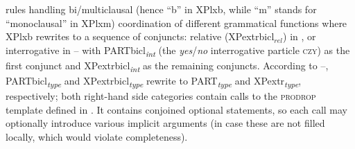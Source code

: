 \documentclass[output=paper]{../langscibook}
\begin{document}
rules handling bi/multiclausal (hence ``b'' in
XPlxb, while ``m'' stands for ``monoclausal'' in XPlxm) coordination of different grammatical
functions where XPlxb rewrites to a sequence of conjuncts: relative
(XPextrbicl$_{rel}$) in , or interrogative
in  – with PARTbicl\textsubscript{\textit{int}} (the
\emph{yes}/\emph{no} interrogative particle \textsc{czy}) as the first
conjunct and XPextrbicl\textsubscript{\textit{int}} as the remaining conjuncts. According
to –, PARTbicl\textsubscript{\textit{type}}
and XPextrbicl\textsubscript{\textit{type}} rewrite to PART\textsubscript{\textit{type}} and XPextr\textsubscript{\textit{type}},
respectively; both right-hand side categories contain calls to the
\textsc{prodrop} template defined in
. It contains conjoined optional
statements, so each call may optionally introduce various implicit arguments (in
case these are not filled locally, which would violate completeness).
\end{document}
